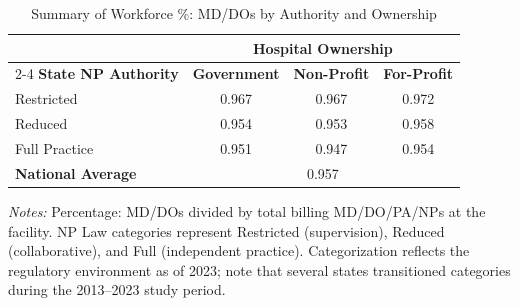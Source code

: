 \begin{table}[htbp]
    \centering
    \caption{Summary of Workforce \%: MD/DOs by Authority and Ownership}
    \label{tab:pct_md}
    \vspace{0.2cm}
    \begin{tabular}{lccc}
        \toprule
        & \multicolumn{3}{c}{\textbf{Hospital Ownership}} \\
        \cmidrule(lr){2-4}
        \textbf{State NP Authority} & \textbf{Government} & \textbf{Non-Profit} & \textbf{For-Profit} \\
        \midrule
        Restricted & 0.967 & 0.967 & 0.972 \\
        Reduced & 0.954 & 0.953 & 0.958 \\
        Full Practice & 0.951 & 0.947 & 0.954 \\
        \midrule
        \textbf{National Average} & \multicolumn{3}{c}{0.957} \\
        \bottomrule
    \end{tabular}
    \vspace{0.1cm}
    \begin{minipage}{0.85\textwidth}
        \footnotesize \textit{Notes:} Percentage: MD/DOs divided by total billing MD/DO/PA/NPs at the facility. NP Law categories represent Restricted (supervision), Reduced (collaborative), and Full (independent practice). Categorization reflects the regulatory environment as of 2023; note that several states transitioned categories during the 2013--2023 study period.
    \end{minipage}
\end{table}